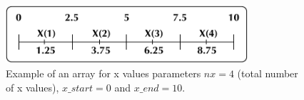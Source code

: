 \begin{figure}[!ht]
    \centering
    \includegraphics[width=0.8\textwidth]{figures/x_grid.pdf}
    \caption{Example of an array for x values parameters $nx=4$ (total number of x values), $x\_start=0$ and $x\_end=10$.}
    \label{fig_x_grid}
\end{figure}







